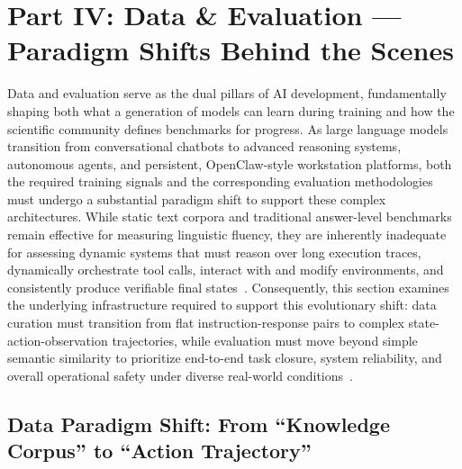 \section{Part IV: Data \& Evaluation — Paradigm Shifts Behind the Scenes}\label{sec:method}

Data and evaluation serve as the dual pillars of AI development, fundamentally shaping both what a generation of models can learn during training and how the scientific community defines benchmarks for progress. As large language models transition from conversational chatbots to advanced reasoning systems, autonomous agents, and persistent, OpenClaw-style workstation platforms, both the required training signals and the corresponding evaluation methodologies must undergo a substantial paradigm shift to support these complex architectures. While static text corpora and traditional answer-level benchmarks remain effective for measuring linguistic fluency, they are inherently inadequate for assessing dynamic systems that must reason over long execution traces, dynamically orchestrate tool calls, interact with and modify environments, and consistently produce verifiable final states~\citep{mishra2026sok,zhu2024pad,abdulloh2025efficient,shao2023synthetic,chen2025unveiling}. Consequently, this section examines the underlying infrastructure required to support this evolutionary shift: data curation must transition from flat instruction-response pairs to complex state-action-observation trajectories, while evaluation must move beyond simple semantic similarity to prioritize end-to-end task closure, system reliability, and overall operational safety under diverse real-world conditions~\citep{feng2024teaching,yu2025chain,do2025effectiveness,shirgaonkar2024knowledge,zhao2025chain,Lumer2025RethinkingRF}.


\subsection{Data Paradigm Shift: From ``Knowledge Corpus'' to ``Action Trajectory''}


